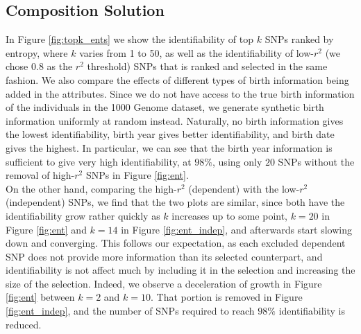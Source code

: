 \documentclass[14pt, oneside]{article}   	%
\begin{document}
\subsection{Composition Solution}
In Figure \ref{fig:topk_ents} we show the identifiability of top $k$ SNPs ranked by entropy, where $k$ varies from 1 to 50,
as well as the identifiability of low-$r^2$ (we chose 0.8 as the $r^2$ threshold) SNPs that is ranked and selected in the same fashion.
We also compare the effects of different types of birth information being added in the attributes.
Since we do not have access to the true birth information of the individuals in the 1000 Genome dataset,
we generate synthetic birth information uniformly at random instead.
Naturally, no birth information gives the lowest identifiability, birth year gives better identifiability, and birth date gives the highest.
In particular, we can see that the birth year information is sufficient to give very high identifiability, at $98\%$,
using only $20$ SNPs without the removal of high-$r^2$ SNPs in Figure \ref{fig:ent}.
\\
On the other hand, comparing the high-$r^2$ (dependent) with the low-$r^2$ (independent) SNPs, 
we find that the two plots are similar, since both have the identifiability grow rather quickly as $k$ increases up to some point,
$k=20$ in Figure \ref{fig:ent} and $k=14$ in Figure \ref{fig:ent_indep}, and afterwards start slowing down and converging.
This follows our expectation, as each excluded dependent SNP does not provide more information than its selected counterpart,
and identifiability is not affect much by including it in the selection and increasing the size of the selection.
Indeed, we observe a deceleration of growth in Figure \ref{fig:ent} between $k=2$ and $k=10$.
That portion is removed in Figure \ref{fig:ent_indep}, and the number of SNPs required to reach $98\%$ identifiability is reduced.
%
%
%
%
\end{document}
